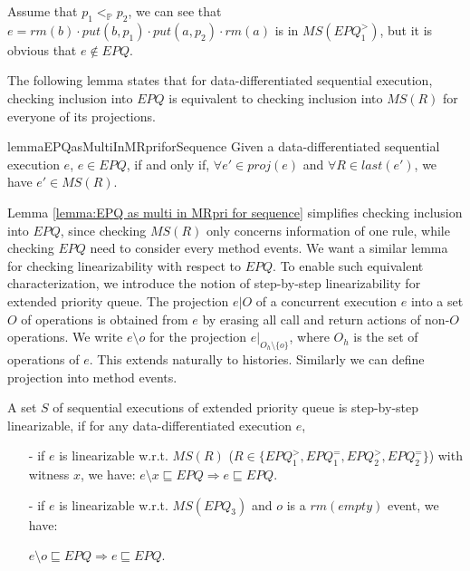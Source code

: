 \begin{example}\label{example:match set of R}
Assume that $p_1 <_{\mathbb{P}} p_2$, we can see that $e = \textit{rm}(b) \cdot \textit{put}(b,p_1) \cdot \textit{put}(a,p_2) \cdot \textit{rm}(a)$ is in $\textit{MS}(\textit{EPQ}_1^{>} )$, but it is obvious that $e \notin \textit{EPQ}$.
\end{example}

The following lemma states that for data-differentiated sequential execution, checking inclusion into $\textit{EPQ}$ is equivalent to checking inclusion into $\textit{MS}(R)$ for everyone of its projections.

\begin{restatable}{lemma}{EPQasMultiInMRpriforSequence}
\label{lemma:EPQ as multi in MRpri for sequence}
Given a data-differentiated sequential execution $e$, $e \in \textit{EPQ}$, if and only if, $\forall e' \in \textit{proj}(e)$ and $\forall R \in \textit{last}(e')$, we have $e' \in \textit{MS}(R)$.
\end{restatable}

Lemma \ref{lemma:EPQ as multi in MRpri for sequence} simplifies checking inclusion into $\textit{EPQ}$, since checking $\textit{MS}(R)$ only concerns information of one rule, while checking $\textit{EPQ}$ need to consider every method events. We want a similar lemma for checking linearizability with respect to $\textit{EPQ}$. To enable such equivalent characterization, we introduce the notion of step-by-step linearizability for extended priority queue. The projection $e \vert{O}$ of a concurrent execution $e$ into a set $O$ of operations is obtained from $e$ by erasing all call and return actions of non-$O$ operations. We write $e \setminus o$ for the projection $e \vert_{ O_h \setminus \{ o \} }$, where $O_h$ is the set of operations of $e$. This extends naturally to histories. Similarly we can define projection into method events.

\begin{definition}\label{def:step-by-step linearizability of extended priority queue}
A set $S$ of sequential executions of extended priority queue is step-by-step linearizable, if for any data-differentiated execution $e$,
\begin{itemize}
\setlength{\itemsep}{0.5pt}
\item[-] if $e$ is linearizable w.r.t. $\textit{MS}(R)$ ($R \in \{ \textit{EPQ}_1^{>}, \textit{EPQ}_1^{=}, \textit{EPQ}_2^{>},\textit{EPQ}_2^{=} \}$) with witness $x$, we have: $e \setminus x \sqsubseteq \textit{EPQ} \Rightarrow e \sqsubseteq \textit{EPQ}$.

\item[-] if $e$ is linearizable w.r.t. $\textit{MS}(\textit{EPQ}_3)$ and $o$ is a $\textit{rm}(\textit{empty})$ event, we have:

$e \setminus o \sqsubseteq \textit{EPQ} \Rightarrow e \sqsubseteq \textit{EPQ}$.
\end{itemize}
\end{definition}

